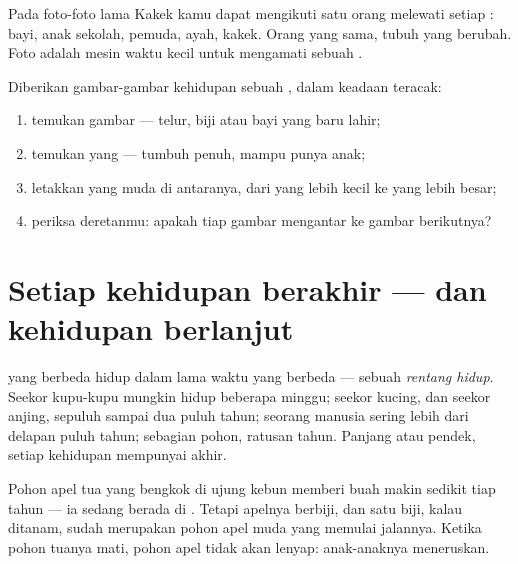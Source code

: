 \begin{example}\label{ex:g2:born-grow-die:photo}
Pada foto-foto lama Kakek kamu dapat mengikuti satu orang melewati
setiap : bayi, anak sekolah, pemuda, ayah, kakek. Orang yang
sama, tubuh yang berubah. Foto adalah mesin waktu kecil untuk
mengamati sebuah .
\end{example}

\begin{method}\label{met:g2:born-grow-die:order}
Diberikan gambar-gambar kehidupan sebuah , dalam keadaan
teracak:
\begin{enumerate}
  \item temukan gambar  --- telur, biji atau bayi yang
        baru lahir;
  \item temukan yang  --- tumbuh penuh, mampu punya anak;
  \item letakkan yang muda di antaranya, dari yang lebih kecil ke yang
        lebih besar;
  \item periksa deretanmu: apakah tiap gambar mengantar ke gambar
        berikutnya?
\end{enumerate}
\end{method}

\section{Setiap kehidupan berakhir --- dan kehidupan berlanjut}

\begin{proposition}\label{prop:g2:born-grow-die:lifespan}
 yang berbeda hidup dalam lama waktu yang berbeda ---
sebuah \emph{rentang hidup}. Seekor kupu-kupu
mungkin hidup beberapa minggu; seekor kucing, dan seekor anjing,
sepuluh sampai dua puluh tahun; seorang manusia sering lebih dari
delapan puluh tahun; sebagian pohon, ratusan tahun. Panjang atau
pendek, setiap kehidupan mempunyai akhir.
\end{proposition}
\admitted

\begin{example}\label{ex:g2:born-grow-die:oldtree}
Pohon apel tua yang bengkok di ujung kebun memberi buah makin sedikit
tiap tahun --- ia sedang berada di . Tetapi apelnya
berbiji, dan satu biji, kalau ditanam, sudah merupakan pohon apel muda
yang memulai jalannya. Ketika pohon tuanya mati, pohon apel tidak akan
lenyap: anak-anaknya meneruskan.
\end{example}

